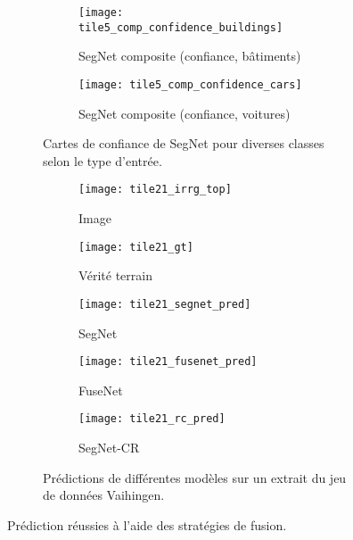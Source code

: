 \begin{figure}[!tb]
\begin{subfigure}{\textwidth}
\begin{subfigure}[t]{0.19\textwidth}
        \end{subfigure}
        \begin{subfigure}[t]{0.19\textwidth}
        	\texttt{[image: tile5\_comp\_confidence\_buildings]}
        	\caption*{SegNet composite (confiance, bâtiments)}
        \end{subfigure}
        \begin{subfigure}[t]{0.19\textwidth}
        	\texttt{[image: tile5\_comp\_confidence\_cars]}
        	\caption*{SegNet composite (confiance, voitures)}
        \end{subfigure}
        \caption{Cartes de confiance de SegNet pour diverses classes selon le type d'entrée.}
        \label{fig:confidence_vaihingen_fusion}
    \end{subfigure}
    \begin{subfigure}{\textwidth}
    	\captionsetup[subfigure]{singlelinecheck=off,justification=centering}
  		\captionsetup[subfigure]{labelformat=empty}
    	\begin{subfigure}{0.19\textwidth}
        	\texttt{[image: tile21\_irrg\_top]}
      		\caption*{Image }
        \end{subfigure}
        \begin{subfigure}{0.19\textwidth}
        	\texttt{[image: tile21\_gt]}
        	\caption*{Vérité terrain}
        \end{subfigure}
        \begin{subfigure}{0.19\textwidth}
        	\texttt{[image: tile21\_segnet\_pred]}
        	\caption*{SegNet}
        \end{subfigure}
        \begin{subfigure}{0.19\textwidth}
        	\texttt{[image: tile21\_fusenet\_pred]}
        	\caption*{FuseNet}
        \end{subfigure}
        \begin{subfigure}{0.19\textwidth}
        	\texttt{[image: tile21\_rc\_pred]}
        	\caption*{SegNet-CR}
        \end{subfigure}
        \caption{Prédictions de différentes modèles sur un extrait du jeu de données  Vaihingen.}
        \label{fig:fusion_exemple2}
    \end{subfigure}

	\caption[Prédiction réussies à l'aide des stratégies de fusion.]{Prédiction réussies à l'aide des stratégies de fusion.\\
  \isprslegende}
   	\label{fig:fusion_success}
\end{figure}

